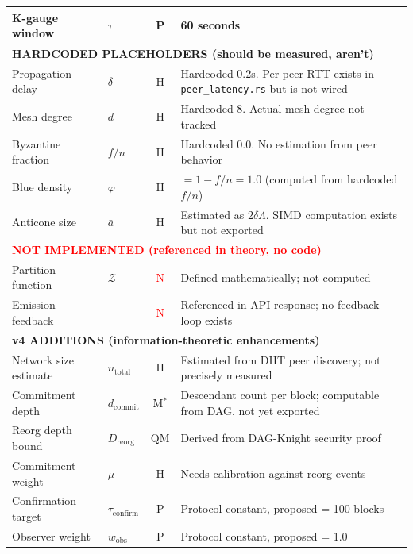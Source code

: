 \documentclass[11pt,a4paper]{article}
\begin{document}
\begin{table}[H]
\begin{tabular}{@{}p{3.5cm}lcp{5cm}@{}}
K-gauge window & $\tau$ & \textcolor{sectionblue}{P} & 60 seconds \\
\midrule
\multicolumn{4}{l}{\textbf{\textcolor{hardcoded}{HARDCODED PLACEHOLDERS (should be measured, aren't)}}} \\
\midrule
Propagation delay & $\delta$ & \textcolor{hardcoded}{H} & Hardcoded 0.2s. Per-peer RTT exists in \texttt{peer\_latency.rs} but is not wired \\
Mesh degree & $d$ & \textcolor{hardcoded}{H} & Hardcoded 8. Actual mesh degree not tracked \\
Byzantine fraction & $f/n$ & \textcolor{hardcoded}{H} & Hardcoded 0.0. No estimation from peer behavior \\
Blue density & $\varphi$ & \textcolor{hardcoded}{H} & $= 1 - f/n = 1.0$ (computed from hardcoded $f/n$) \\
Anticone size & $\bar{a}$ & \textcolor{hardcoded}{H} & Estimated as $2\delta\Lambda$. SIMD computation exists but not exported \\
\midrule
\multicolumn{4}{l}{\textbf{\textcolor{red}{NOT IMPLEMENTED (referenced in theory, no code)}}} \\
\midrule
Partition function & $\mathcal{Z}$ & \textcolor{red}{N} & Defined mathematically; not computed \\
Emission feedback & --- & \textcolor{red}{N} & Referenced in API response; no feedback loop exists \\
\midrule
\multicolumn{4}{l}{\textbf{\textcolor{sectionblue}{v4 ADDITIONS (information-theoretic enhancements)}}} \\
\midrule
Network size estimate & $n_{\text{total}}$ & \textcolor{hardcoded}{H} & Estimated from DHT peer discovery; not precisely measured \\
Commitment depth & $d_{\text{commit}}$ & M$^*$ & Descendant count per block; computable from DAG, not yet exported \\
Reorg depth bound & $D_{\text{reorg}}$ & \textcolor{hardcoded}{QM} & Derived from DAG-Knight security proof \\
Commitment weight & $\mu$ & \textcolor{hardcoded}{H} & Needs calibration against reorg events \\
Confirmation target & $\tau_{\text{confirm}}$ & P & Protocol constant, proposed = 100 blocks \\
Observer weight & $w_{\text{obs}}$ & P & Protocol constant, proposed = 1.0 \\
\bottomrule
\end{tabular}
\end{table}
\end{document}
